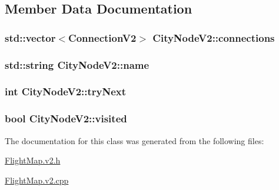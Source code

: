 \subsection{Member Data Documentation}
\subsubsection[{\texorpdfstring{connections}{connections}}]{\setlength{\rightskip}{0pt plus 5cm}std\+::vector$<${\bf Connection\+V2}$>$ City\+Node\+V2\+::connections}\hypertarget{class_city_node_v2_a57050772b435bb5dc6570ded05ef2245}{}\label{class_city_node_v2_a57050772b435bb5dc6570ded05ef2245}
\subsubsection[{\texorpdfstring{name}{name}}]{\setlength{\rightskip}{0pt plus 5cm}std\+::string City\+Node\+V2\+::name}\hypertarget{class_city_node_v2_a3cf01413b0ca939d0811ab649981d4a5}{}\label{class_city_node_v2_a3cf01413b0ca939d0811ab649981d4a5}
\subsubsection[{\texorpdfstring{try\+Next}{tryNext}}]{\setlength{\rightskip}{0pt plus 5cm}int City\+Node\+V2\+::try\+Next}\hypertarget{class_city_node_v2_a1d674990d58d6a94c4fe4bc6211a8082}{}\label{class_city_node_v2_a1d674990d58d6a94c4fe4bc6211a8082}
\subsubsection[{\texorpdfstring{visited}{visited}}]{\setlength{\rightskip}{0pt plus 5cm}bool City\+Node\+V2\+::visited}\hypertarget{class_city_node_v2_a906dfb4dcfacbae15c57a316ab81036e}{}\label{class_city_node_v2_a906dfb4dcfacbae15c57a316ab81036e}


The documentation for this class was generated from the following files\+:\begin{DoxyCompactItemize}
\item 
\hyperlink{_flight_map_8v2_8h}{Flight\+Map.\+v2.\+h}\item 
\hyperlink{_flight_map_8v2_8cpp}{Flight\+Map.\+v2.\+cpp}\end{DoxyCompactItemize}
